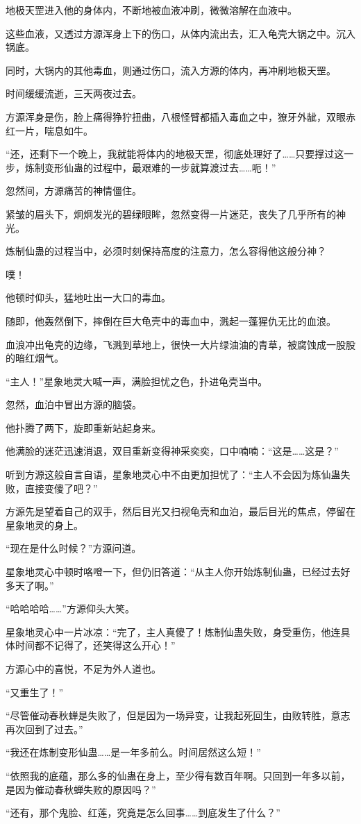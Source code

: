 \begin{this_body}
地极天罡进入他的身体内，不断地被血液冲刷，微微溶解在血液中。

这些血液，又透过方源浑身上下的伤口，从体内流出去，汇入龟壳大锅之中。沉入锅底。

同时，大锅内的其他毒血，则通过伤口，流入方源的体内，再冲刷地极天罡。

时间缓缓流逝，三天两夜过去。

方源浑身是伤，脸上痛得狰狞扭曲，八根怪臂都插入毒血之中，獠牙外龇，双眼赤红一片，喘息如牛。

“还，还剩下一个晚上，我就能将体内的地极天罡，彻底处理好了……只要撑过这一步，炼制变形仙蛊的过程中，最艰难的一步就算渡过去……呃！”

忽然间，方源痛苦的神情僵住。

紧皱的眉头下，炯炯发光的碧绿眼眸，忽然变得一片迷茫，丧失了几乎所有的神光。

炼制仙蛊的过程当中，必须时刻保持高度的注意力，怎么容得他这般分神？

噗！

他顿时仰头，猛地吐出一大口的毒血。

随即，他轰然倒下，摔倒在巨大龟壳中的毒血中，溅起一蓬猩仇无比的血浪。

血浪冲出龟壳的边缘，飞溅到草地上，很快一大片绿油油的青草，被腐蚀成一股股的暗红烟气。

“主人！”星象地灵大喊一声，满脸担忧之色，扑进龟壳当中。

忽然，血泊中冒出方源的脑袋。

他扑腾了两下，旋即重新站起身来。

他满脸的迷茫迅速消退，双目重新变得神采奕奕，口中喃喃：“这是……这是？”

听到方源这般自言自语，星象地灵心中不由更加担忧了：“主人不会因为炼仙蛊失败，直接变傻了吧？”

方源先是望着自己的双手，然后目光又扫视龟壳和血泊，最后目光的焦点，停留在星象地灵的身上。

“现在是什么时候？”方源问道。

星象地灵心中顿时咯噔一下，但仍旧答道：“从主人你开始炼制仙蛊，已经过去好多天了啊。”

“哈哈哈哈……”方源仰头大笑。

星象地灵心中一片冰凉：“完了，主人真傻了！炼制仙蛊失败，身受重伤，他连具体时间都不记得了，还笑得这么开心！”

方源心中的喜悦，不足为外人道也。

“又重生了！”

“尽管催动春秋蝉是失败了，但是因为一场异变，让我起死回生，由败转胜，意志再次回到了过去。”

“我还在炼制变形仙蛊……是一年多前么。时间居然这么短！”

“依照我的底蕴，那么多的仙蛊在身上，至少得有数百年啊。只回到一年多以前，是因为催动春秋蝉失败的原因吗？”

“还有，那个鬼脸、红莲，究竟是怎么回事……到底发生了什么？”

\end{this_body}

